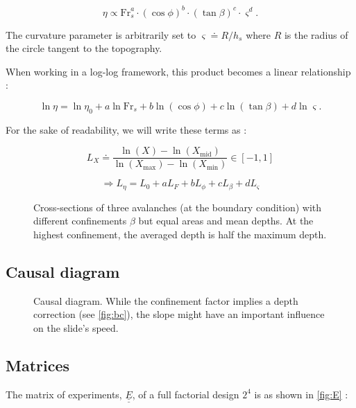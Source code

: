\documentclass[a4paper,11pt]{article}
\begin{document}
\[
\eta \propto \mathrm{Fr}_s^a \cdot \left(\cos\phi\right)^b \cdot \left(\tan\beta\right)^c \cdot \varsigma^d. \tag{2}
\]

The curvature parameter is arbitrarily set to \(\varsigma\doteq R/h_s\)
where \(R\) is the radius of the circle tangent to the topography.

When working in a log-log framework, this product becomes a linear
relationship :

\[
\ln\eta = \ln\eta_0 + a\ln\mathrm{Fr}_s+b\ln(\cos\phi)+c\ln \left(\tan\beta\right)+d\ln\varsigma.
\]

For the sake of readability, we will write these terms as :

\[
L_X \doteq \frac{\ln(X)-\ln(X_\mathrm{mid})}{\ln(X_\mathrm{max}) - \ln(X_\mathrm{min})} \in [-1, 1]
\]

\[
\Rightarrow L_\eta = L_0 + aL_F + bL_\phi + cL_\beta + dL_\varsigma
\]

\begin{figure}
\hypertarget{fig:bc}{%
\centering

\caption{Cross-sections of three avalanches (at the boundary condition)
with different confinements \(\beta\) but equal areas and mean depths.
At the highest confinement, the averaged depth is half the maximum
depth.}\label{fig:bc}
}
\end{figure}

\hypertarget{causal-diagram}{%
\subsection{Causal diagram}\label{causal-diagram}}

\begin{figure}
\hypertarget{fig:cd}{%
\centering

\caption{Causal diagram. While the confinement factor implies a depth
correction (see \autoref{fig:bc}), the slope might have an important
influence on the slide's speed.}\label{fig:cd}
}
\end{figure}

\hypertarget{matrices}{%
\subsection{Matrices}\label{matrices}}

The matrix of experiments, \(\underline{\underline{E}}\), of a full
factorial design \(2^4\) is as shown in \autoref{fig:E} :
\end{document}
